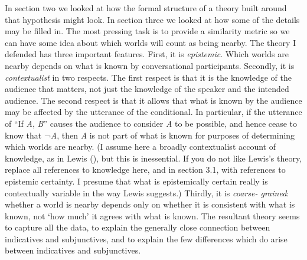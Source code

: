 \documentclass[
  11pt,
  letterpaper,
  DIV=11,
  numbers=noendperiod,
  twoside]{scrartcl}
\begin{document}
In section two we looked at how the formal structure of a theory built
around that hypothesis might look. In section three we looked at how
some of the details may be filled in. The most pressing task is to
provide a similarity metric so we can have some idea about which worlds
will count as being nearby. The theory I defended has three important
features. First, it is \emph{epistemic}. Which worlds are nearby depends
on what is known by conversational participants. Secondly, it is
\emph{contextualist} in two respects. The first respect is that it is
the knowledge of the audience that matters, not just the knowledge of
the speaker and the intended audience. The second respect is that it
allows that what is known by the audience may be affected by the
utterance of the conditional. In particular, if the utterance of ``If
\emph{A}, \emph{B}'' causes the audience to consider \emph{A} to be
possible, and hence cease to know that ¬\emph{A}, then \emph{A} is not
part of what is known for purposes of determining which worlds are
nearby. (I assume here a broadly contextualist account of knowledge, as
in Lewis (), but this is inessential. If
you do not like Lewis's theory, replace all references to knowledge
here, and in section 3.1, with references to epistemic certainty. I
presume that what is epistemically certain really is contextually
variable in the way Lewis suggests.) Thirdly, it is \emph{coarse-
grained}: whether a world is nearby depends only on whether it is
consistent with what is known, not `how much' it agrees with what is
known. The resultant theory seems to capture all the data, to explain
the generally close connection between indicatives and subjunctives, and
to explain the few differences which do arise between indicatives and
subjunctives.
\end{document}

